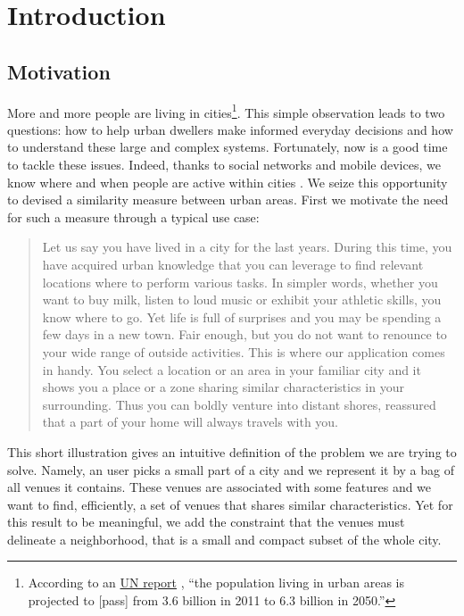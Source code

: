 \chapter{Introduction}
\label{ch:introduction}

\section{Motivation}

More and more people are living in cities\footnote{According to an
\href{http://esa.un.org/unup/pdf/WUP2011_Highlights.pdf}{UN report}
\autocite{UNreport12}, \enquote{the population living in urban areas is
projected to [pass] from 3.6 billion in 2011 to 6.3 billion in 2050.}}. This
simple observation leads to two questions: how to help urban dwellers make
informed everyday decisions and how to understand these large and complex
systems. Fortunately, now is a good time to tackle these issues. Indeed, thanks
to social networks and mobile devices, we know where and when people are
active within cities \autocite{SpatialComputing12}. We seize this opportunity
to devised a similarity measure between urban areas. First we motivate the
need for such a measure through a typical use case:

\begin{quote}
Let us say you have lived in a city for the last years. During this time,
you have acquired urban knowledge that you can leverage to find relevant
locations where to perform various tasks. In simpler words, whether you want
to buy milk, listen to loud music or exhibit your athletic skills, you know
where to go. Yet life is full of surprises and you may be spending a few
days in a new town. Fair enough, but you do not want to renounce to your
wide range of outside activities. This is where our application comes in
handy. You select a location or an area in your familiar city and it shows
you a place or a zone sharing similar characteristics in your surrounding.
Thus you can boldly venture into distant shores, reassured that a part of
your home will always travels with you.
\end{quote}

This short illustration gives an intuitive definition of the problem we are
trying to solve. Namely, an user picks a small part of a city and we represent
it by a bag of all venues it contains. These venues are associated with some
features and we want to find, efficiently, a set of venues that shares similar
characteristics. Yet for this result to be meaningful, we add the constraint
that the venues must delineate a neighborhood, that is a small and compact
subset of the whole city.

